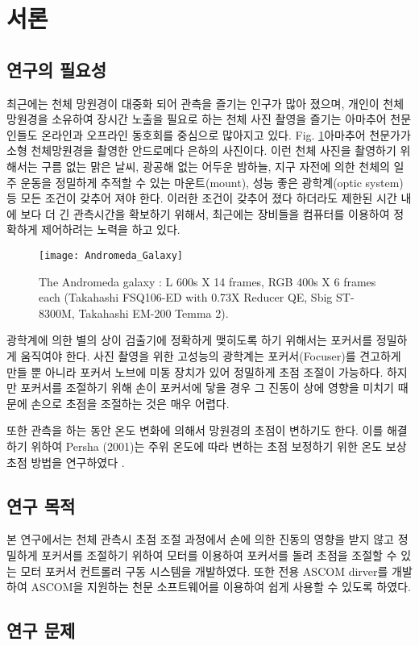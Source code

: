 \section{서론}

\subsection{연구의 필요성}

최근에는 천체 망원경이 대중화 되어 관측을 즐기는 인구가 많아 졌으며, 개인이 천체 망원경을 소유하여 장시간 노출을 필요로 하는 천체 사진 촬영을 즐기는 아마추어 천문인들도 온라인과 오프라인 동호회를 중심으로 많아지고 있다. Fig. \ref{fig:The_Andromeda_Galaxy}\은 아마추어 천문가가 소형 천체망원경을 촬영한 안드로메다 은하의 사진이다. 이런 천체 사진을 촬영하기 위해서는 구름 없는 맑은 날씨, 광공해 없는 어두운 밤하늘, 지구 자전에 의한 천체의 일주 운동을 정밀하게 추적할 수 있는 마운트(mount), 성능 좋은 광학계(optic system) 등 모든 조건이 갖추어 져야 한다. 이러한 조건이 갖추어 졌다 하더라도 제한된 시간 내에 보다 더 긴 관측시간을 확보하기 위해서, 최근에는 장비들을 컴퓨터를 이용하여 정확하게 제어하려는 노력을 하고 있다. 

\begin{figure}[H]
	\begin{center}
		\texttt{[image: Andromeda\_Galaxy]}
		\caption{The Andromeda galaxy : L 600s X 14 frames, RGB 400s X 6 frames each (Takahashi FSQ106-ED with 0.73X Reducer QE, Sbig ST-8300M, Takahashi EM-200 Temma 2).}
		\label{fig:The_Andromeda_Galaxy}
	\end{center}
\end{figure}

광학계에 의한 별의 상이 검출기에 정확하게 맺히도록 하기 위해서는 포커서를 정밀하게 움직여야 한다. 사진 촬영을 위한 고성능의 광학계는 포커서(Focuser)를 견고하게 만들 뿐 아니라 포커서 노브에 미동 장치가 있어 정밀하게 초점 조절이 가능하다. 하지만 포커서를 조절하기 위해 손이 포커서에 닿을 경우 그 진동이 상에 영향을 미치기 때문에 손으로 초점을 조절하는 것은 매우 어렵다. 

또한 관측을 하는 동안 온도 변화에 의해서 망원경의 초점이 변하기도 한다. 이를 해결하기 위하여 Persha (2001)는 주위 온도에 따라 변하는 초점 보정하기 위한 온도 보상 초점 방법을 연구하였다 \cite{persha2001temperature}.


\subsection{연구 목적}

본 연구에서는 천체 관측시 초점 조절 과정에서 손에 의한 진동의 영향을 받지 않고 정밀하게 포커서를 조절하기 위하여 모터를 이용하여 포커서를 돌려 초점을 조절할 수 있는 모터 포커서 컨트롤러 구동 시스템을 개발하였다. 또한 전용 ASCOM dirver를 개발하여 ASCOM을 지원하는 천문 소프트웨어를 이용하여 쉽게 사용할 수 있도록 하였다. 


\subsection{연구 문제}

